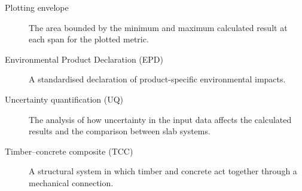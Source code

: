 \begin{description}
    \item[Plotting envelope]
    The area bounded by the minimum and maximum calculated result at each span for the plotted metric.

    \item[Environmental Product Declaration (EPD)]
    A standardised declaration of product-specific environmental impacts.

    \item[Uncertainty quantification (UQ)]
    The analysis of how uncertainty in the input data affects the calculated results and the comparison between slab systems.

    \item[Timber--concrete composite (TCC)]
    A structural system in which timber and concrete act together through a mechanical connection.


\end{description}
